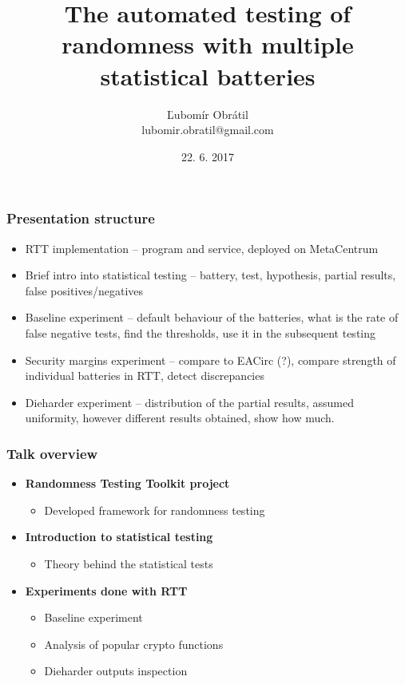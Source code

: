 \documentclass[aspectratio=169]{beamer}
\title[Randomness Testing Toolkit]{The automated testing of randomness with multiple statistical batteries} %
\author[lubomir.obratil@gmail.com]{Ľubomír Obrátil\\lubomir.obratil@gmail.com} %
\date{22. 6. 2017} %
\begin{document}
\begin{frame}
\titlepage %
\end{frame}

\begin{frame}
\frametitle{Presentation structure}

\begin{itemize}
\item RTT implementation -- program and service, deployed on MetaCentrum
\item Brief intro into statistical testing -- battery, test, hypothesis, partial results, false positives/negatives
\item Baseline experiment -- default behaviour of the batteries, what is the rate of false negative tests, find the thresholds, use it in the subsequent testing
\item Security margins experiment -- compare to EACirc (?), compare strength of individual batteries in RTT, detect discrepancies
\item Dieharder experiment -- distribution of the partial results, assumed uniformity, however different results obtained, show how much.
\end{itemize}

\end{frame}


\begin{frame}
\frametitle{Talk overview}
\begin{itemize}
\item \textbf{Randomness Testing Toolkit project}
\begin{itemize}
\item Developed framework for randomness testing
\end{itemize}
\item \textbf{Introduction to statistical testing}
\begin{itemize}
\item Theory behind the statistical tests
\end{itemize} 
\item \textbf{Experiments done with RTT}
\begin{itemize}
\item Baseline experiment
\item Analysis of popular crypto functions
\item Dieharder outputs inspection
\end{itemize}
\end{itemize}
\end{frame}
\end{document}
